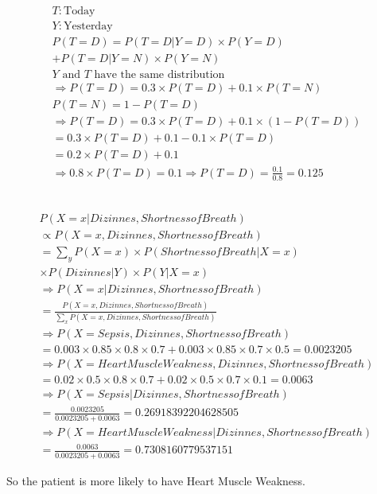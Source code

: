 \documentclass[en]{university}
\begin{document}
\begin{gather*}
    T : \text{Today} \\
    Y : \text{Yesterday} \\
    P(T = D) = P(T = D | Y = D) \times P(Y = D) \\ + P(T = D | Y = N) \times P(Y = N) \\
    \text{$Y$ and $T$ have the same distribution} \\
    \Rightarrow P(T = D) = 0.3 \times P(T = D) + 0.1 \times P(T = N) \\
    P(T = N) = 1 - P(T = D) \\
    \Rightarrow P(T = D) = 0.3 \times P(T = D) + 0.1 \times (1 - P(T = D)) \\
    = 0.3 \times P(T = D) + 0.1 - 0.1 \times P(T = D) \\
    = 0.2 \times P(T = D) + 0.1 \\
    \Rightarrow 0.8 \times P(T = D) = 0.1 \Rightarrow P(T = D) = \frac{0.1}{0.8} = 0.125 \\
\end{gather*}

\subsection{}

\begin{gather*}
    P(X = x | Dizinnes, Shortness of Breath) \\ \propto P(X = x, Dizinnes, Shortness of Breath) \\
    = \sum_{y} P(X = x) \times P(Shortness of Breath | X = x) \\ \times P(Dizinnes | Y) \times P(Y | X = x) \\
    \Rightarrow P(X = x | Dizinnes, Shortness of Breath) \\ = \frac{P(X = x, Dizinnes, Shortness of Breath)}{\sum_{x} P(X = x, Dizinnes, Shortness of Breath)} \\
    \Rightarrow P(X = Sepsis, Dizinnes, Shortness of Breath) \\ = 0.003 \times 0.85 \times 0.8 \times 0.7 + 0.003 \times 0.85 \times 0.7 \times 0.5 = 0.0023205 \\
    \Rightarrow P(X = Heart Muscle Weakness, Dizinnes, Shortness of Breath) \\ = 0.02 \times 0.5 \times 0.8 \times 0.7 + 0.02 \times 0.5 \times 0.7 \times 0.1 = 0.0063 \\
    \Rightarrow P(X = Sepsis | Dizinnes, Shortness of Breath) \\ = \frac{0.0023205}{0.0023205 + 0.0063} = 0.26918392204628505 \\
    \Rightarrow P(X = Heart Muscle Weakness | Dizinnes, Shortness of Breath) \\ = \frac{0.0063}{0.0023205 + 0.0063} = 0.7308160779537151
\end{gather*}

So the patient is more likely to have Heart Muscle Weakness.
\end{document}

